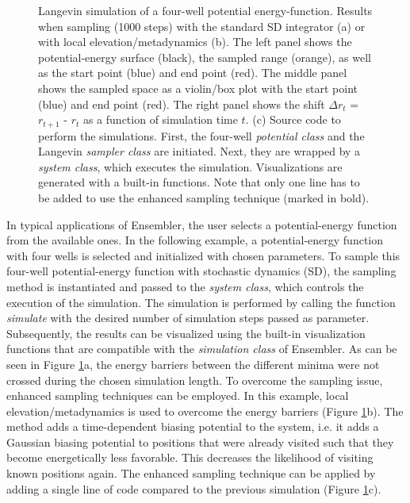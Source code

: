\begin{figure}
\begin{subfigure}{\textwidth}
	\end{subfigure}
\caption{Langevin simulation of a four-well potential energy-function. Results when sampling (1000 steps) with the standard SD integrator (a) or with local elevation\cite{Huber1994}/metadynamics\cite{Laio2002} (b). The left panel shows the potential-energy surface (black), the sampled range (orange), as well as the start point (blue) and end point (red). The middle panel shows the sampled space as a violin/box plot with the start point (blue) and end point (red). The right panel shows the shift $\Delta r_t$ = $r_{t+1}$ - $r_t$ as a function of simulation time $t$.
	(c) Source code to perform the simulations. First, the four-well \textit{potential class} and the Langevin \textit{sampler class} are initiated. Next, they are wrapped by a \textit{system class}, which executes the simulation. Visualizations are generated with a built-in functions. Note that only one line has to be added to use the enhanced sampling technique (marked in bold).}
\label{fig:code_example_simulations}
\end{figure}

In typical applications of Ensembler, the user selects a potential-energy function from the available ones. In the following example, a potential-energy function with four wells is selected and initialized with chosen parameters. 
To sample this four-well potential-energy function with stochastic dynamics (SD),\cite{Brunger1984} the sampling method is instantiated and passed to the \textit{system class}, which controls the execution of the simulation. 
The simulation is performed by calling the function \textit{simulate} with the desired number of simulation steps passed as parameter. 
Subsequently, the results can be visualized using the built-in visualization functions that are compatible with the \textit{simulation class} of Ensembler.  
As can be seen in Figure \ref{fig:code_example_simulations}a, the energy barriers between the different minima were not crossed during the chosen simulation length. 
To overcome the sampling issue, enhanced sampling techniques can be employed.\cite{Pohorille2010} 
In this example, local elevation\cite{Huber1994}/metadynamics\cite{Laio2002} is used to overcome the energy barriers (Figure \ref{fig:code_example_simulations}b).
The method adds a time-dependent biasing potential to the system, i.e. it adds a Gaussian biasing potential to positions that were already visited such that they become energetically less favorable. This decreases the likelihood of visiting known positions again. 
The enhanced sampling technique can be applied by adding a single line of code compared to the previous simulation (Figure \ref{fig:code_example_simulations}c).

